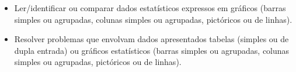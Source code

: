 {\begin{escolha}
\begin{itemize}
    \item Ler/identificar ou comparar dados estatísticos expressos em gráficos
(barras simples ou agrupadas, colunas simples ou agrupadas, pictóricos
ou de linhas).

    \item Resolver problemas que envolvam dados apresentados tabelas (simples ou
de dupla entrada) ou gráficos estatísticos (barras simples ou agrupadas,
colunas simples ou agrupadas, pictóricos ou de linhas).
\end{itemize}


\end{escolha}}
